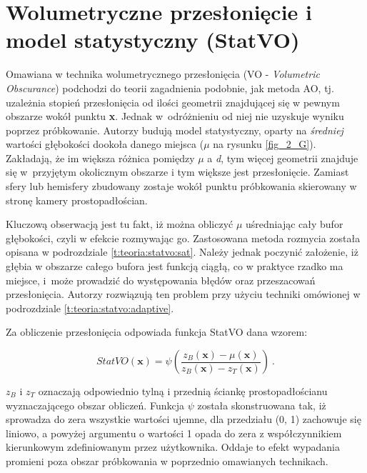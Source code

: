 	\section{Wolumetryczne przesłonięcie i model statystyczny (StatVO)}
	\label{t:teoria:statvo}
	
	Omawiana w \cite{statvo} technika wolumetrycznego przesłonięcia (VO - \textit{Volumetric Obscurance}) podchodzi do teorii zagadnienia podobnie, jak metoda AO, tj. uzależnia stopień przesłonięcia od ilości geometrii znajdującej się w pewnym obszarze wokół punktu \textbf{x}. Jednak w~odróżnieniu od niej nie uzyskuje wyniku poprzez próbkowanie. Autorzy \cite{statvo} budują model statystyczny, oparty na \textit{średniej} wartości głębokości dookoła danego miejsca (\(\mu\) na rysunku \ref{fig_2_G}). Zakładają, że im większa różnica pomiędzy \(\mu\) a \textit{d}, tym więcej geometrii znajduje się w~przyjętym okolicznym obszarze i tym większe jest przesłonięcie. Zamiast sfery lub hemisfery zbudowany zostaje wokół punktu próbkowania skierowany w stronę kamery prostopadłościan.
	
	
	Kluczową obserwacją jest tu fakt, iż można obliczyć \(\mu\) uśredniając cały bufor głębokości, czyli w efekcie rozmywając go. Zastosowana metoda rozmycia została opisana w podrozdziale \ref{t:teoria:statvo:sat}. Należy jednak poczynić założenie, iż głębia w obszarze całego bufora jest funkcją ciągłą, co w praktyce rzadko ma miejsce, i~może prowadzić do występowania błędów oraz przeszacowań przesłonięcia. Autorzy rozwiązują ten problem przy użyciu techniki omówionej w podrozdziale \ref{t:teoria:statvo:adaptive}.
	
	
	Za obliczenie przesłonięcia odpowiada funkcja StatVO dana wzorem:
	
	\begin{equation}
	\mathit{StatVO}(\mathbf{x}) = \psi(\frac{z_{B}(\mathbf{x}) - \mu(\mathbf{x})}{z_{B}(\mathbf{x}) - z_{T}(\mathbf{x})})\ .
	\end{equation}
	
	\(z_{B}\) i \(z_{T}\) oznaczają odpowiednio tylną i przednią ściankę prostopadłościanu wyznaczającego obszar obliczeń. Funkcja \(\psi\) została skonstruowana tak, iż sprowadza do zera wszystkie wartości ujemne, dla przedziału (0, 1) zachowuje się liniowo, a powyżej argumentu o wartości 1 opada do zera z współczynnikiem kierunkowym zdefiniowanym przez użytkownika. Oddaje to efekt wypadania promieni poza obszar próbkowania w poprzednio omawianych technikach.
	
